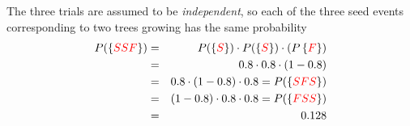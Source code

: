 \documentclass[smaller]{beamer}\usepackage[]{graphicx}\usepackage[]{color}
\renewcommand{\Pr}{P}
\begin{document}

\begin{frame}{\secname}%


  \begin{example}[continued]
  \begin{footnotesize}
  The three trials are assumed to be \emph{independent}, so
  each of the three seed events corresponding to two trees growing has
  the same probability%
  \begin{eqnarray*}
  \Pr (\left\{
  \color{red}%
  SSF%
  \color{black}%
  \right\})  &=&\Pr (\left\{
  \color{red}%
  S%
  \color{black}%
  \right\}) \cdot \Pr (\left\{
  \color{red}%
  S%
  \color{black}%
  \right\} ) \cdot (\Pr \left\{
  \color{red}%
  F%
  \color{black}%
  \right\}  ) \\
  &=&0.8\cdot 0.8\cdot (1-0.8) \\
  &=&0.8\cdot (1-0.8)\cdot 0.8 =\Pr (\left\{
  \color{red}%
  SFS%
  \color{black}%
  \right\})  \\
  &=&(1-0.8)\cdot 0.8\cdot 0.8= \Pr (\left\{
  \color{red}%
  FSS
  \color{black}%
  \right\} ) \\
  &=&0.128
  \end{eqnarray*}


\end{footnotesize}
\end{example}
\end{frame}
\end{document}

